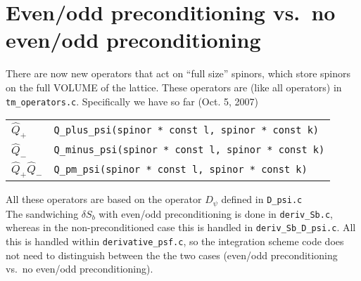 \section{Even/odd preconditioning vs.\ no even/odd preconditioning}

There are now new operators that act on ``full size'' spinors, which store spinors on the full VOLUME of the lattice. These operators are (like all operators) in \texttt{tm\_operators.c}. Specifically we have so far (Oct. 5, 2007)
\begin{center}
\begin{tabular}{ll}
$\hat{Q}_+$ & \texttt{Q\_plus\_psi(spinor * const l, spinor * const k)}\\
$\hat{Q}_-$ & \texttt{Q\_minus\_psi(spinor * const l, spinor * const k)}\\
$\hat{Q}_+ \hat{Q}_-$ & \texttt{Q\_pm\_psi(spinor * const l, spinor * const k)}
\end{tabular}
\end{center}
All these operators are based on the operator $D_\psi$ defined in \texttt{D\_psi.c}\\


The sandwiching $\delta S_b$ with even/odd preconditioning is done in \texttt{deriv\_Sb.c}, whereas in the non-preconditioned case this is handled in \texttt{deriv\_Sb\_D\_psi.c}. All this is handled within \texttt{derivative\_psf.c}, so the integration scheme code does not need to distinguish between the the two cases (even/odd preconditioning vs.\ no even/odd preconditioning).  


